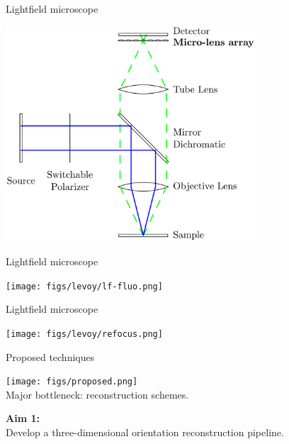 \documentclass[presentation]{beamer}
\begin{document}
\begin{frame}[label=sec-1]{Lightfield microscope}
 \begin{center}
   \includegraphics[width=0.7\textwidth]{figs/fluo-lf.pdf}
 \end{center}
\end{frame}

\begin{frame}[label=sec-1]{Lightfield microscope}
 \begin{center}
   \texttt{[image: figs/levoy/lf-fluo.png]}
 \end{center}
\end{frame}

\begin{frame}[label=sec-1]{Lightfield microscope}
 \begin{center}
   \texttt{[image: figs/levoy/refocus.png]}
 \end{center}
\end{frame}

\begin{frame}{Proposed techniques}
   \begin{center}
     \texttt{[image: figs/proposed.png]}\\ \vspace{1.5em}
     Major bottleneck: reconstruction schemes.
   \end{center}
   
\end{frame}


\begin{frame}{}
  \begin{center}
    \textbf{Aim 1:}\\ \vspace{1em}
    Develop a three-dimensional orientation reconstruction pipeline.
  \end{center}
\end{frame}
\end{document}
